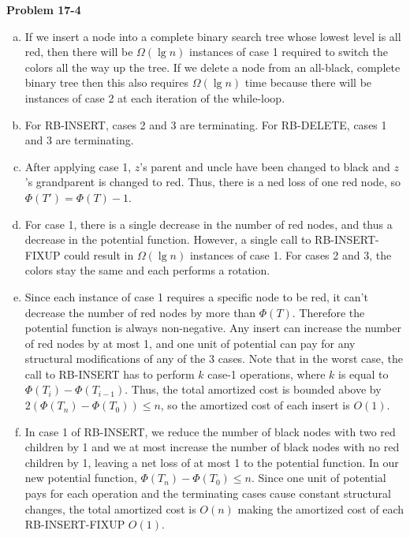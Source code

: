 \documentclass{article}
\begin{document}
\noindent\textbf{Problem 17-4}\\
\begin{enumerate}[a.]
\item If we insert a node into a complete binary search tree whose lowest level is all red, then there will be $\Omega(\lg n)$ instances of case 1 required to switch the colors all the way up the tree.  If we delete a node from an all-black, complete binary tree then this also requires $\Omega(\lg n)$ time because there will be instances of case 2 at each iteration of the while-loop. \\

\item For RB-INSERT, cases 2 and 3 are terminating.  For RB-DELETE, cases 1 and 3 are terminating. \\

\item After applying case 1, $z$'s parent and uncle have been changed to black and $z$'s grandparent is changed to red.  Thus, there is a ned loss of one red node, so $\Phi(T') = \Phi(T) - 1$.\\

\item For case 1, there is a single decrease in the number of red nodes, and thus a decrease in the potential function.  However, a single call to RB-INSERT-FIXUP could result in $\Omega(\lg n)$ instances of case 1.  For cases 2 and 3, the colors stay the same and each performs a rotation.\\

\item Since each instance of case 1 requires a specific node to be red, it can't decrease the number of red nodes by more than $\Phi(T)$.  Therefore the potential function is always non-negative. Any insert can increase the number of red nodes by at most 1, and one unit of potential can pay for any structural modifications of any of the 3 cases.  Note that in the worst case, the call to RB-INSERT has to perform $k$ case-1 operations, where $k$ is equal to $\Phi(T_i) - \Phi(T_{i-1})$. Thus, the total amortized cost is bounded above by $2(\Phi(T_n) - \Phi(T_0)) \leq n$, so the amortized cost of each insert is $O(1)$. \\

\item In case 1 of RB-INSERT, we reduce the number of black nodes with two red children by 1 and we at most increase the number of black nodes with no red children by 1, leaving a net loss of at most 1 to the potential function. In our new potential function, $\Phi(T_n) - \Phi(T_0) \leq n$.  Since one unit of potential pays for each operation and the terminating cases cause constant structural changes, the total amortized cost is $O(n)$ making the amortized cost of each RB-INSERT-FIXUP $O(1)$. \\


\end{enumerate}
\end{document}
